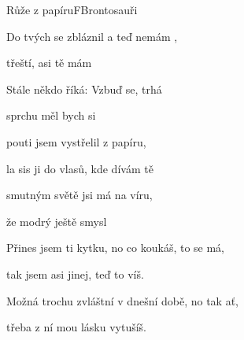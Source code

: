 \setcounter{page}{75}
\begin{song}{Růže z papíru}{F}{Brontosauři}

\begin{SBVerse}

Do tvých  se zbláznil a teď  nemám ,

 třeští, asi tě mám 

Stále někdo říká: Vzbuď se, trhá 

 sprchu měl bych si 

\end{SBVerse}

\begin{SBChorus}

 pouti jsem vystřelil  z papíru,

la sis ji do vlasů, kde dívám tě 

 smutným světě jsi má  na víru,

že  modrý ještě smysl 

\end{SBChorus}

\begin{SBVerse}

Přines jsem ti kytku, no co koukáš, to se má,

tak jsem asi jinej, teď to víš.

Možná trochu zvláštní v dnešní době, no tak ať,

třeba z ní mou lásku vytušíš.

\end{SBVerse}

\begin{SBChorus}

\end{SBChorus}

\end{song}

\clearpage
